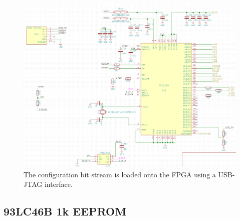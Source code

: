 \begin{figure}[h]
  \centering
  \includegraphics[width=\textwidth]{data/usb-ft2232.png}
  \caption{The configuration bit stream is loaded onto the FPGA using a USB-JTAG interface.}
  \label{fig:usb-ft2232}
\end{figure}

\subsection{93LC46B 1k EEPROM}
\label{sec:93lc46b}

